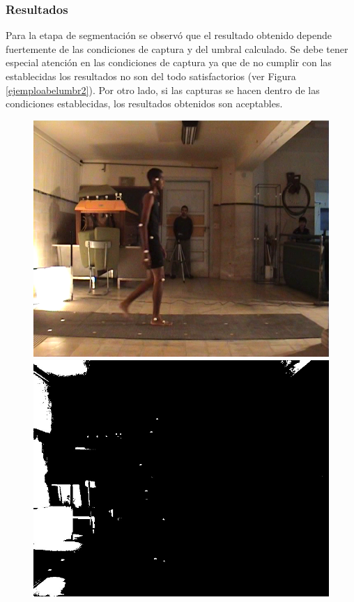 \subsubsection{Resultados}
Para la etapa de segmentación se observó que el resultado obtenido depende fuertemente de las condiciones de captura y del umbral calculado. Se debe tener especial atención en las condiciones de captura ya que de no cumplir con las establecidas los resultados no son del todo satisfactorios (ver Figura \ref{ejemploabelumbr2}). Por otro lado, si las capturas se hacen dentro de las condiciones establecidas, los resultados obtenidos son aceptables.
%
\begin{figure}[ht!]
      \centering
        {\includegraphics[scale=0.10]{imagenes/abel_original_video.png}\label{abelvideo}}\hspace{1 mm}
        {\includegraphics[scale=0.10]{imagenes/abel_original_filtro.png}\label{abelfiltro}}

\end{figure}

